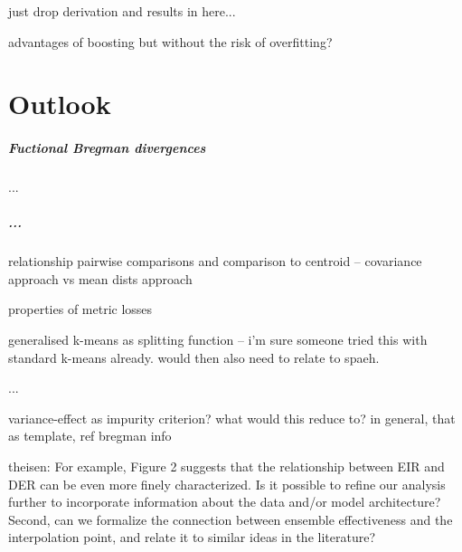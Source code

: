 \documentclass[
    a4paper, %
	fontsize=10pt, %
	twoside=false, %
]{kaobook}
\begin{document}
\begin{titlepage}
just drop derivation and results in here...

advantages of boosting but without the risk of overfitting?

\chapter{Outlook}

\paragraph{Fuctional Bregman divergences} ...

\paragraph{...}

relationship pairwise comparisons and comparison to centroid -- covariance approach vs mean dists approach

properties of metric losses

generalised k-means as splitting function -- i'm sure someone tried this with standard k-means already. would then also need to relate to spaeh.

...

variance-effect as impurity criterion? what would this reduce to? in general, that as template, ref bregman info

theisen:
For
example, Figure 2 suggests that the relationship between EIR and DER can be even more finely characterized. Is it
possible to refine our analysis further to incorporate information about the data and/or model architecture? Second,
can we formalize the connection between ensemble effectiveness and the interpolation point, and relate it to similar
ideas in the literature?


\backmatter %



\end{titlepage}
\end{document}
